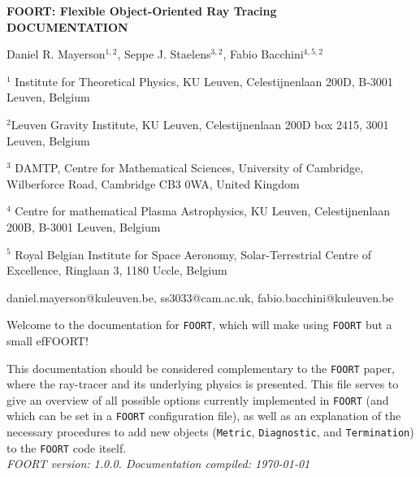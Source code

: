 \documentclass[11pt,a4paper]{article}
\newcommand{\code}[1]{{\tt #1}}
\begin{document}
\begin{titlepage}

\begin{flushright}
\small
\normalsize
\end{flushright}

\begin{center}


{\LARGE \textbf{FOORT: Flexible Object-Oriented Ray Tracing\\ \vspace{1em} DOCUMENTATION}}


\vspace{0.5 cm} {\large Daniel R. Mayerson$^{1,2}$, Seppe J. Staelens$^{3,2}$, Fabio Bacchini$^{4,5,2}$}\\

\medskip\medskip

 
 {$^1$ Institute for Theoretical Physics, KU Leuven, Celestijnenlaan 200D, B-3001 Leuven, Belgium}

  {$^2$Leuven Gravity Institute, KU Leuven,
 Celestijnenlaan 200D box 2415, 3001 Leuven, Belgium}

 {$^3$ DAMTP, Centre for Mathematical Sciences, University of Cambridge, Wilberforce Road, Cambridge CB3 0WA, United Kingdom}

 {$^4$ Centre for mathematical Plasma Astrophysics, KU Leuven, Celestijnenlaan 200B, B-3001 Leuven, Belgium}
 
 {$^5$ Royal Belgian Institute for Space Aeronomy, Solar-Terrestrial Centre of Excellence, Ringlaan 3, 1180 Uccle, Belgium}
 
 
\medskip\medskip

 daniel.mayerson@kuleuven.be, ss3033@cam.ac.uk,  fabio.bacchini@kuleuven.be


\end{center}
\noindent 
Welcome to the documentation for \code{FOORT}, which will make using \code{FOORT} but a small efFOORT!

This documentation should be considered complementary to the \code{FOORT} paper, where the ray-tracer and its underlying physics is presented. This file serves to give an overview of all possible options currently implemented in \code{FOORT} (and which can be set in a \code{FOORT} configuration file), as well as an explanation of the necessary procedures to add new objects (\code{Metric}, \code{Diagnostic}, and \code{Termination}) to the \code{FOORT} code itself.\\

\emph{FOORT version: 1.0.0. Documentation compiled: \today}






\setcounter{tocdepth}{2}
\tableofcontents

\end{titlepage}
\newpage
\end{document}
